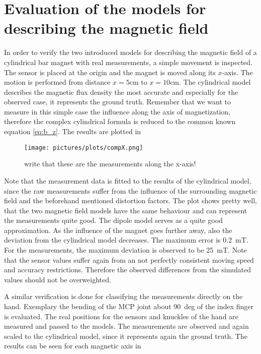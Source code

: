 \section{Evaluation of the models for describing the magnetic field} \label{sec:modelDif}

In order to verify the two introduced models for describing the magnetic field of a cylindrical bar magnet with real measurements, a simple movement is inspected. The sensor is placed at the origin and the magnet is moved along its $ x $-axis. The motion is performed from distance $ x=5\si{\cm} $ to $ x=10\si{\cm} $. The cylindrical model describes the magnetic flux density the most accurate and especially for the observed case, it represents the ground truth. Remember that we want to measure in this simple case the influence along the axis of magnetization, therefore the complex cylindrical formula is reduced to the common known equation \ref{eq:b_z}. The results are plotted in  %

\begin{figure}[h]
\centering
\texttt{[image: pictures/plots/compX.png]}
\caption{write that these are the measurements along the x-axis!}
\label{fig:modCompFlat}
\end{figure}

Note that the measurement data is fitted to the results of the cylindrical model, since the raw measurements suffer from the influence of the surrounding magnetic field and the beforehand mentioned distortion factors. The plot shows pretty well, that the two magnetic field models have the same behaviour and can represent the measurements quite good. The dipole model serves as a quite good approximation. As the influence of the magnet goes further away, also the deviation from the cylindrical model decreases. The maximum error is \SI{0.2}{\milli \tesla}. For the measurements, the maximum deviation is observed to be \SI{25}{\milli \tesla}. Note that the sensor values suffer again from an not perfectly consistent moving speed and accuracy restrictions. Therefore the observed differences from the simulated values should not be overweighted.

A similar verification is done for classifying the measurements directly on the hand. Exemplary the bending of the \ac{MCP} joint about \SI{90}{deg} of the index finger is evaluated. The real positions for the sensors and knuckles of the hand are measured and passed to the models. The measurements are observed and again scaled to the cylindrical model, since it represents again the ground truth. The results can be seen for each magnetic axis in  %

